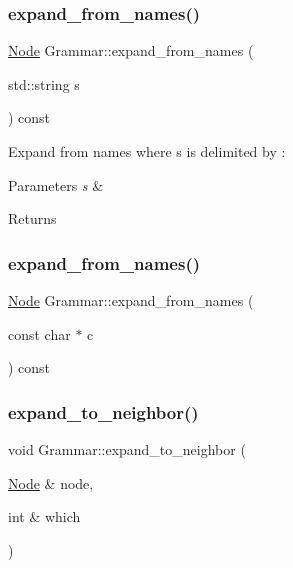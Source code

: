 \subsubsection{\texorpdfstring{expand\+\_\+from\+\_\+names()}{expand\_from\_names()}\hspace{0.1cm}{\footnotesize\ttfamily [2/3]}}
{\footnotesize\ttfamily \hyperlink{class_node}{Node} Grammar\+::expand\+\_\+from\+\_\+names (\begin{DoxyParamCaption}\item[{std\+::string}]{s }\end{DoxyParamCaption}) const\hspace{0.3cm}{\ttfamily [inline]}}

Expand from names where s is delimited by \textquotesingle{}\+:\textquotesingle{} 
\begin{DoxyParams}{Parameters}
{\em s} & \\
\hline
\end{DoxyParams}
\begin{DoxyReturn}{Returns}

\end{DoxyReturn}
\mbox{\label{class_grammar_a0addff494602ebb19852c2d4314eaac6}} 
\subsubsection{\texorpdfstring{expand\+\_\+from\+\_\+names()}{expand\_from\_names()}\hspace{0.1cm}{\footnotesize\ttfamily [3/3]}}
{\footnotesize\ttfamily \hyperlink{class_node}{Node} Grammar\+::expand\+\_\+from\+\_\+names (\begin{DoxyParamCaption}\item[{const char $\ast$}]{c }\end{DoxyParamCaption}) const\hspace{0.3cm}{\ttfamily [inline]}}

\mbox{\label{class_grammar_abd380ec308907ddc26acb22196610b83}} 
\subsubsection{\texorpdfstring{expand\+\_\+to\+\_\+neighbor()}{expand\_to\_neighbor()}}
{\footnotesize\ttfamily void Grammar\+::expand\+\_\+to\+\_\+neighbor (\begin{DoxyParamCaption}\item[{\hyperlink{class_node}{Node} \&}]{node,  }\item[{int \&}]{which }\end{DoxyParamCaption})\hspace{0.3cm}{\ttfamily [inline]}}

